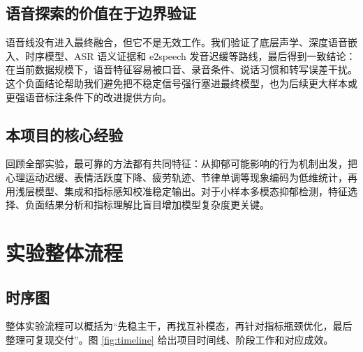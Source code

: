 \documentclass[UTF8,zihao=-4,fontset=windows]{ctexart}
\begin{document}
\subsection{语音探索的价值在于边界验证}

语音线没有进入最终融合，但它不是无效工作。我们验证了底层声学、深度语音嵌入、时序模型、ASR 语义证据和 e2speech 发音迟缓等路线，最后得到一致结论：在当前数据规模下，语音特征容易被口音、录音条件、说话习惯和转写误差干扰。这个负面结论帮助我们避免把不稳定信号强行塞进最终模型，也为后续更大样本或更强语音标注条件下的改进提供方向。

\subsection{本项目的核心经验}

回顾全部实验，最可靠的方法都有共同特征：从抑郁可能影响的行为机制出发，把心理运动迟缓、表情活跃度下降、疲劳轨迹、节律单调等现象编码为低维统计，再用浅层模型、集成和指标感知校准稳定输出。对于小样本多模态抑郁检测，特征选择、负面结果分析和指标理解比盲目增加模型复杂度更关键。

\section{实验整体流程}

\subsection{时序图}

整体实验流程可以概括为“先稳主干，再找互补模态，再针对指标瓶颈优化，最后整理可复现交付”。图 \ref{fig:timeline} 给出项目时间线、阶段工作和对应成效。
\end{document}
